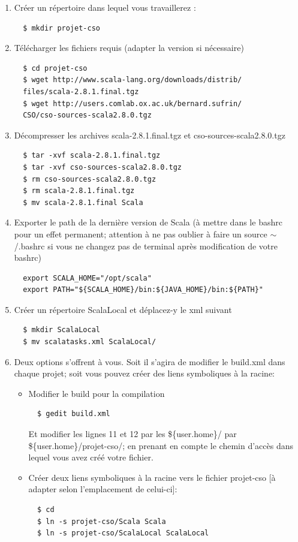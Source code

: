 \documentclass[a4paper,11pt,french]{report}
\begin{document}
\begin{enumerate}
\item Créer un répertoire dans lequel vous travaillerez : 
  \begin{verbatim} 
  $ mkdir projet-cso
  \end{verbatim}
\item Télécharger les fichiers requis (adapter la version si nécessaire)
  \begin{verbatim} 
  $ cd projet-cso
  $ wget http://www.scala-lang.org/downloads/distrib/
  files/scala-2.8.1.final.tgz
  $ wget http://users.comlab.ox.ac.uk/bernard.sufrin/
  CSO/cso-sources-scala2.8.0.tgz
  \end{verbatim}
  
\item Décompresser les archives scala-2.8.1.final.tgz et cso-sources-scala2.8.0.tgz
  \begin{verbatim} 
  $ tar -xvf scala-2.8.1.final.tgz
  $ tar -xvf cso-sources-scala2.8.0.tgz
  $ rm cso-sources-scala2.8.0.tgz
  $ rm scala-2.8.1.final.tgz
  $ mv scala-2.8.1.final Scala
  \end{verbatim}
  
\item Exporter le path de la dernière version de Scala (à mettre dans le bashrc pour un effet permanent; attention à ne pas oublier à faire un \textsf{source $\sim$/.bashrc} si vous ne changez pas de terminal après modification de votre \textsf{bashrc}) 
  \begin{verbatim}   
  export SCALA_HOME="/opt/scala" 
  export PATH="${SCALA_HOME}/bin:${JAVA_HOME}/bin:${PATH}"
  \end{verbatim}

\item Créer un répertoire ScalaLocal et déplacez-y le xml suivant
  \begin{verbatim} 
  $ mkdir ScalaLocal
  $ mv scalatasks.xml ScalaLocal/
  \end{verbatim}

\item Deux options s'offrent à vous. Soit il s'agira de modifier le build.xml dans chaque projet; soit vous pouvez créer des liens symboliques à la racine:
\begin{itemize}
\item Modifier le build pour la compilation
  \begin{verbatim} 
  $ gedit build.xml
  \end{verbatim}
  Et modifier les lignes 11 et 12 par les \$\{user.home\}/  par  \$\{user.home\}/projet-cso/; en prenant en compte le chemin d'accès dans lequel vous avez créé votre fichier.
\item Créer deux liens symboliques à la racine vers le fichier projet-cso [à adapter selon l'emplacement de celui-ci]:
  \begin{verbatim} 
  $ cd
  $ ln -s projet-cso/Scala Scala
  $ ln -s projet-cso/ScalaLocal ScalaLocal
  \end{verbatim}
\end{itemize}


\end{enumerate}
\end{document}
